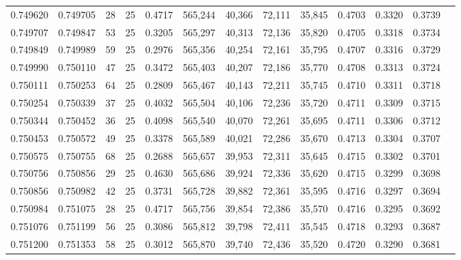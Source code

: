 \begin{tabular}{rrrrrrrrrrrrr}
0.749620 & 0.749705 &    28 &  25 &                                     0.4717 & 565,244 &  40,366 &  72,111 &  35,845 & 0.4703 & 0.3320 & 0.3739 \\
0.749707 & 0.749847 &    53 &  25 &                                     0.3205 & 565,297 &  40,313 &  72,136 &  35,820 & 0.4705 & 0.3318 & 0.3734 \\
0.749849 & 0.749989 &    59 &  25 &                                     0.2976 & 565,356 &  40,254 &  72,161 &  35,795 & 0.4707 & 0.3316 & 0.3729 \\
0.749990 & 0.750110 &    47 &  25 &                                     0.3472 & 565,403 &  40,207 &  72,186 &  35,770 & 0.4708 & 0.3313 & 0.3724 \\
0.750111 & 0.750253 &    64 &  25 &                                     0.2809 & 565,467 &  40,143 &  72,211 &  35,745 & 0.4710 & 0.3311 & 0.3718 \\
0.750254 & 0.750339 &    37 &  25 &                                     0.4032 & 565,504 &  40,106 &  72,236 &  35,720 & 0.4711 & 0.3309 & 0.3715 \\
0.750344 & 0.750452 &    36 &  25 &                                     0.4098 & 565,540 &  40,070 &  72,261 &  35,695 & 0.4711 & 0.3306 & 0.3712 \\
0.750453 & 0.750572 &    49 &  25 &                                     0.3378 & 565,589 &  40,021 &  72,286 &  35,670 & 0.4713 & 0.3304 & 0.3707 \\
0.750575 & 0.750755 &    68 &  25 &                                     0.2688 & 565,657 &  39,953 &  72,311 &  35,645 & 0.4715 & 0.3302 & 0.3701 \\
0.750756 & 0.750856 &    29 &  25 &                                     0.4630 & 565,686 &  39,924 &  72,336 &  35,620 & 0.4715 & 0.3299 & 0.3698 \\
0.750856 & 0.750982 &    42 &  25 &                                     0.3731 & 565,728 &  39,882 &  72,361 &  35,595 & 0.4716 & 0.3297 & 0.3694 \\
0.750984 & 0.751075 &    28 &  25 &                                     0.4717 & 565,756 &  39,854 &  72,386 &  35,570 & 0.4716 & 0.3295 & 0.3692 \\
0.751076 & 0.751199 &    56 &  25 &                                     0.3086 & 565,812 &  39,798 &  72,411 &  35,545 & 0.4718 & 0.3293 & 0.3687 \\
0.751200 & 0.751353 &    58 &  25 &                                     0.3012 & 565,870 &  39,740 &  72,436 &  35,520 & 0.4720 & 0.3290 & 0.3681 \\

\end{tabular}
